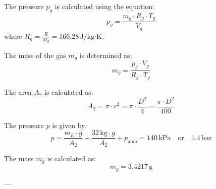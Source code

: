 The pressure \( p_g \) is calculated using the equation:  
\[
p_g = \frac{m_g \cdot R_g \cdot T_g}{V_g}
\]  
where \( R_g = \frac{R}{M_g} = 166.28 \, \text{J/kg·K} \).  

The mass of the gas \( m_g \) is determined as:  
\[
m_g = \frac{p_g \cdot V_g}{R_g \cdot T_g}
\]  

The area \( A_2 \) is calculated as:  
\[
A_2 = \pi \cdot r^2 = \pi \cdot \frac{D^2}{4} = \frac{\pi \cdot D^2}{400}
\]  

The pressure \( p \) is given by:  
\[
p = \frac{m_E \cdot g}{A_2} + \frac{32 \, \text{kg} \cdot g}{A_2} + p_{\text{amb}} = 140 \, \text{kPa} \quad \text{or} \quad 1.4 \, \text{bar}
\]  

The mass \( m_g \) is calculated as:  
\[
m_g = 3.4217 \, \text{g}
\]  

---
